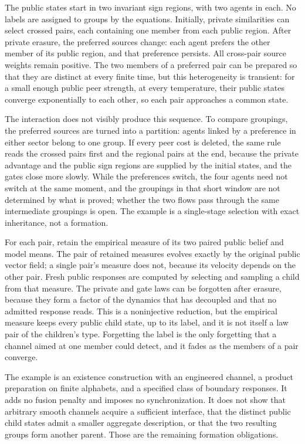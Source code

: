 The public states start in two invariant sign regions, with two agents in each. No labels are assigned to groups by the equations. Initially, private similarities can select crossed pairs, each containing one member from each public region. After private erasure, the preferred sources change: each agent prefers the other member of its public region, and that preference persists. All cross-pair source weights remain positive. The two members of a preferred pair can be prepared so that they are distinct at every finite time, but this heterogeneity is transient: for a small enough public peer strength, at every temperature, their public states converge exponentially to each other, so each pair approaches a common state.

The interaction does not visibly produce this sequence. To compare groupings, the preferred sources are turned into a partition: agents linked by a preference in either sector belong to one group. If every peer cost is deleted, the same rule reads the crossed pairs first and the regional pairs at the end, because the private advantage and the public sign regions are supplied by the initial states, and the gates close more slowly. While the preferences switch, the four agents need not switch at the same moment, and the groupings in that short window are not determined by what is proved; whether the two flows pass through the same intermediate groupings is open. The example is a single-stage selection with exact inheritance, not a formation.

For each pair, retain the empirical measure of its two paired public belief and model means. The pair of retained measures evolves exactly by the original public vector field; a single pair's measure does not, because its velocity depends on the other pair. Fresh public responses are computed by selecting and sampling a child from that measure. The private and gate laws can be forgotten after erasure, because they form a factor of the dynamics that has decoupled and that no admitted response reads. This is a noninjective reduction, but the empirical measure keeps every public child state, up to its label, and it is not itself a law pair of the children's type. Forgetting the label is the only forgetting that a channel aimed at one member could detect, and it fades as the members of a pair converge.

The example is an existence construction with an engineered channel, a product preparation on finite alphabets, and a specified class of boundary responses. It adds no fusion penalty and imposes no synchronization. It does not show that arbitrary smooth channels acquire a sufficient interface, that the distinct public child states admit a smaller aggregate description, or that the two resulting groups form another parent. Those are the remaining formation obligations.
